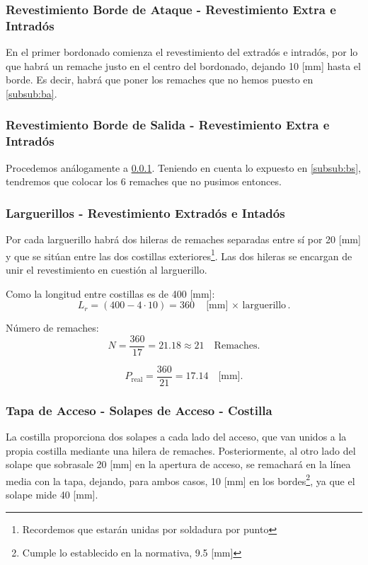 \subsubsection{Revestimiento Borde de Ataque - Revestimiento Extra e Intradós} \label{subsub:rba}
En el primer bordonado comienza el revestimiento del extradós e intradós, por lo que habrá un remache justo en el centro del bordonado, dejando 10 [mm] hasta el borde. Es decir, habrá que poner los remaches que no hemos puesto en \ref{subsub:ba}.


\subsubsection{Revestimiento Borde de Salida - Revestimiento Extra e Intradós}
Procedemos análogamente a \ref{subsub:rba}. Teniendo en cuenta lo expuesto en \ref{subsub:bs}, tendremos que colocar los 6 remaches que no pusimos entonces.

\subsubsection{Larguerillos - Revestimiento Extradós e Intadós}
Por cada larguerillo habrá dos hileras de remaches separadas entre sí por 20 [mm] y que se sitúan entre las dos costillas exteriores\footnote{Recordemos que estarán unidas por soldadura por punto}. Las dos hileras se encargan de unir el revestimiento en cuestión al larguerillo. 

Como la longitud entre costillas es de 400 [mm]:
\begin{equation}
    L_r = (400 - 4 \cdot 10) = 360 \quad \text{[mm] $\times$ larguerillo}.
\end{equation}

Número de remaches:
\begin{equation}
    N = \dfrac{360}{17} = 21.18 \approx 21 \quad \text{Remaches}.
\end{equation}

\begin{equation}
    P_{\text{real}} = \dfrac{360}{21} = 17.14 \quad \text{[mm]}.
\end{equation}

\subsubsection{Tapa de Acceso - Solapes de Acceso - Costilla}
La costilla proporciona dos solapes a cada lado del acceso, que van unidos a la propia costilla mediante una hilera de remaches. Posteriormente, al otro lado del solape que sobrasale 20 [mm] en la apertura de acceso, se remachará en la línea media con la tapa, dejando, para ambos casos, 10 [mm] en los bordes\footnote{Cumple lo establecido en la normativa, 9.5 [mm]}, ya que el solape mide 40 [mm].

